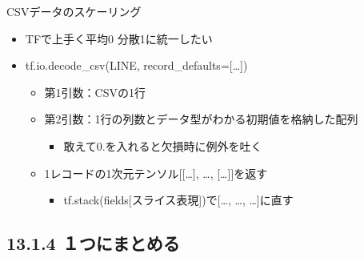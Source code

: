 \documentclass[aspectratio=169, dvipdfmx, 14pt, xcolor={svgnames,dvipsnames}, t]{beamer}
\begin{document}

\begin{frame}{CSVデータのスケーリング}

  \begin{itemize}
    \tightlist
    \item
          TFで上手く平均0 分散1に統一したい
    \item
          tf.io.decode\_csv(LINE, record\_defaults={[}\ldots{]})

          \begin{itemize}
            \tightlist
            \item
                  第1引数：CSVの1行
            \item
                  第2引数：1行の列数とデータ型がわかる初期値を格納した配列

                  \begin{itemize}
                    \tightlist
                    \item
                          敢えて0.を入れると欠損時に例外を吐く
                  \end{itemize}
            \item
                  \alert{1レコードの1次元テンソル{[}{[}\ldots{]}, \ldots, {[}\ldots{]}{]}を返す}

                  \begin{itemize}
                    \tightlist
                    \item
                          tf.stack(fields{[}スライス表現{]})で{[}\ldots, \ldots,
                          \ldots{]}に直す
                  \end{itemize}
          \end{itemize}
  \end{itemize}

\end{frame}


\hypertarget{ux3064ux306bux307eux3068ux3081ux308b}{%
  \subsection{13.1.4 １つにまとめる}\label{ux3064ux306bux307eux3068ux3081ux308b}}

\end{document}
